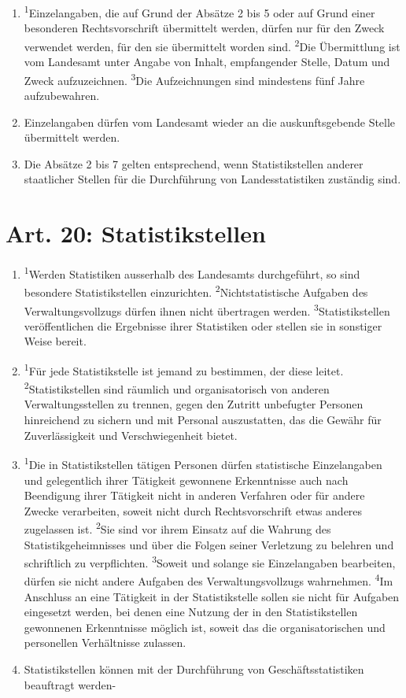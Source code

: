 \documentclass[A4, 12pt]{scrbook}
\begin{document}
\begin{enumerate}[label=(\arabic*)]
            \item \textsuperscript{1}Einzelangaben, die auf Grund der Absätze 2 bis 5 oder auf Grund einer besonderen Rechtsvorschrift übermittelt werden, dürfen nur für den Zweck verwendet werden, für den sie über\-mittelt worden sind. \textsuperscript{2}Die Übermittlung ist vom Landesamt unter Angabe von Inhalt, empfangender Stelle, Datum und Zweck aufzuzeichnen. \textsuperscript{3}Die Aufzeichnungen sind mindestens fünf Jahre aufzubewahren.
            \item Einzelangaben dürfen vom Landesamt wieder an die auskunftsgebende Stelle über\-mittelt werden. 
            \item Die Absätze 2 bis 7 gelten entsprechend, wenn Statistikstellen anderer staatlicher Stellen für die Durchführung von Landesstatistiken zuständig sind. 
        \end{enumerate}
        
    \section{Art. 20: Statistikstellen}
        \begin{enumerate}[label=(\arabic*)]
            \item \textsuperscript{1}Werden Statistiken ausserhalb des Landesamts durchgeführt, so sind besondere Statistikstellen einzurichten. \textsuperscript{2}Nichtstatistische Aufgaben des Verwaltungsvollzugs dürfen ihnen nicht übertragen werden. \textsuperscript{3}Statistikstellen veröffentlichen die Ergebnisse ihrer Statistiken oder stellen sie in sonstiger Weise bereit.
            \item \textsuperscript{1}Für jede Statistikstelle ist jemand zu bestimmen, der diese leitet. \textsuperscript{2}Statistikstellen sind räumlich und organisatorisch von anderen Verwaltungsstellen zu trennen, gegen den Zutritt unbefugter Personen hinreichend zu sichern und mit Personal auszustatten, das die Gewähr für Zuverlässigkeit und Verschwiegenheit bietet.
            \item \textsuperscript{1}Die in Statistikstellen tätigen Personen dürfen statistische Einzelangaben und gelegentlich ihrer Tätigkeit gewonnene Erkenntnisse auch nach Beendigung ihrer Tätigkeit nicht in anderen Verfahren oder für andere Zwecke verarbeiten, soweit nicht durch Rechtsvorschrift etwas anderes zugelassen ist. \textsuperscript{2}Sie sind vor ihrem Einsatz auf die Wahrung des Statistikgeheimnisses und über die Folgen seiner Verletzung zu belehren und schriftlich zu verpflichten. \textsuperscript{3}Soweit und solange sie Einzelangaben bearbeiten, dürfen sie nicht andere Aufgaben des Verwaltungsvollzugs wahrnehmen. \textsuperscript{4}Im Anschluss an eine Tätigkeit in der Statistikstelle sollen sie nicht für Aufgaben eingesetzt werden, bei denen eine Nutzung der in den Statistikstellen gewonnenen Erkenntnisse möglich ist, soweit das die organisatorischen und personellen Verhältnisse zulassen.
            \item Statistikstellen können mit der Durchführung von Geschäftsstatistiken beauftragt werden-
        \end{enumerate}
\end{document}
